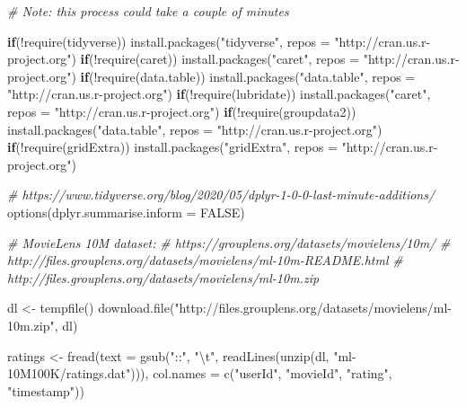 \documentclass[
]{article}
\newenvironment{Shaded}{}{}
\newcommand{\AttributeTok}[1]{\textcolor[rgb]{0.49,0.56,0.16}{#1}}
\newcommand{\CommentTok}[1]{\textcolor[rgb]{0.38,0.63,0.69}{\textit{#1}}}
\newcommand{\ConstantTok}[1]{\textcolor[rgb]{0.53,0.00,0.00}{#1}}
\newcommand{\ControlFlowTok}[1]{\textcolor[rgb]{0.00,0.44,0.13}{\textbf{#1}}}
\newcommand{\FunctionTok}[1]{\textcolor[rgb]{0.02,0.16,0.49}{#1}}
\newcommand{\NormalTok}[1]{#1}
\newcommand{\OtherTok}[1]{\textcolor[rgb]{0.00,0.44,0.13}{#1}}
\newcommand{\SpecialCharTok}[1]{\textcolor[rgb]{0.25,0.44,0.63}{#1}}
\newcommand{\StringTok}[1]{\textcolor[rgb]{0.25,0.44,0.63}{#1}}
\begin{document}
\begin{Shaded}
\begin{Highlighting}[]
\CommentTok{\# Note: this process could take a couple of minutes}

\ControlFlowTok{if}\NormalTok{(}\SpecialCharTok{!}\FunctionTok{require}\NormalTok{(tidyverse)) }\FunctionTok{install.packages}\NormalTok{(}\StringTok{"tidyverse"}\NormalTok{, }\AttributeTok{repos =} \StringTok{"http://cran.us.r{-}project.org"}\NormalTok{)}
\ControlFlowTok{if}\NormalTok{(}\SpecialCharTok{!}\FunctionTok{require}\NormalTok{(caret)) }\FunctionTok{install.packages}\NormalTok{(}\StringTok{"caret"}\NormalTok{, }\AttributeTok{repos =} \StringTok{"http://cran.us.r{-}project.org"}\NormalTok{)}
\ControlFlowTok{if}\NormalTok{(}\SpecialCharTok{!}\FunctionTok{require}\NormalTok{(data.table)) }\FunctionTok{install.packages}\NormalTok{(}\StringTok{"data.table"}\NormalTok{, }\AttributeTok{repos =} \StringTok{"http://cran.us.r{-}project.org"}\NormalTok{)}
\ControlFlowTok{if}\NormalTok{(}\SpecialCharTok{!}\FunctionTok{require}\NormalTok{(lubridate)) }\FunctionTok{install.packages}\NormalTok{(}\StringTok{"caret"}\NormalTok{, }\AttributeTok{repos =} \StringTok{"http://cran.us.r{-}project.org"}\NormalTok{)}
\ControlFlowTok{if}\NormalTok{(}\SpecialCharTok{!}\FunctionTok{require}\NormalTok{(groupdata2)) }\FunctionTok{install.packages}\NormalTok{(}\StringTok{"data.table"}\NormalTok{, }\AttributeTok{repos =} \StringTok{"http://cran.us.r{-}project.org"}\NormalTok{)}
\ControlFlowTok{if}\NormalTok{(}\SpecialCharTok{!}\FunctionTok{require}\NormalTok{(gridExtra)) }\FunctionTok{install.packages}\NormalTok{(}\StringTok{"gridExtra"}\NormalTok{, }\AttributeTok{repos =} \StringTok{"http://cran.us.r{-}project.org"}\NormalTok{)}

\CommentTok{\# https://www.tidyverse.org/blog/2020/05/dplyr{-}1{-}0{-}0{-}last{-}minute{-}additions/}
\FunctionTok{options}\NormalTok{(}\AttributeTok{dplyr.summarise.inform =} \ConstantTok{FALSE}\NormalTok{)}

\CommentTok{\# MovieLens 10M dataset:}
\CommentTok{\# https://grouplens.org/datasets/movielens/10m/}
\CommentTok{\# http://files.grouplens.org/datasets/movielens/ml{-}10m{-}README.html}
\CommentTok{\# http://files.grouplens.org/datasets/movielens/ml{-}10m.zip}

\NormalTok{dl }\OtherTok{\textless{}{-}} \FunctionTok{tempfile}\NormalTok{()}
\FunctionTok{download.file}\NormalTok{(}\StringTok{"http://files.grouplens.org/datasets/movielens/ml{-}10m.zip"}\NormalTok{, dl)}

\NormalTok{ratings }\OtherTok{\textless{}{-}} \FunctionTok{fread}\NormalTok{(}\AttributeTok{text =} \FunctionTok{gsub}\NormalTok{(}\StringTok{"::"}\NormalTok{, }\StringTok{"}\SpecialCharTok{\textbackslash{}t}\StringTok{"}\NormalTok{, }\FunctionTok{readLines}\NormalTok{(}\FunctionTok{unzip}\NormalTok{(dl, }\StringTok{"ml{-}10M100K/ratings.dat"}\NormalTok{))),}
                 \AttributeTok{col.names =} \FunctionTok{c}\NormalTok{(}\StringTok{"userId"}\NormalTok{, }\StringTok{"movieId"}\NormalTok{, }\StringTok{"rating"}\NormalTok{, }\StringTok{"timestamp"}\NormalTok{))}


\end{Highlighting}
\end{Shaded}
\end{document}
